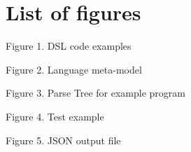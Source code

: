 \chapter*{List of figures}

Figure 1. DSL code examples

Figure 2. Language meta-model

Figure 3. Parse Tree for example program

Figure 4. Test example

Figure 5. JSON output file